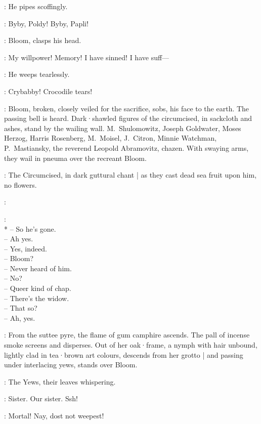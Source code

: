 :
He pipes scoffingly.

\Bello:
Byby,
Poldy!
Byby,
Papli!

:
Bloom,
clasps his head.

\Bloom:
My willpower!
Memory!
I have sinned!
I have suff---

:
He weeps tearlessly.

\Bello:
Crybabby!
Crocodile tears!


:
Bloom,
broken,
closely veiled for the sacrifice,
sobs,
his face to the earth.
%
The passing bell is heard.
Dark·shawled figures of the circumcised,
in sackcloth and ashes,
stand by the wailing wall.
M.~Shulomowitz,
Joseph Goldwater,
Moses Herzog,
Harris Rosenberg,
M.~Moisel,
J.~Citron,
Minnie Watchman,
P.~Mastiansky,
the reverend Leopold Abramovitz,
chazen.
With swaying arms,
they wail in pneuma over the recreant Bloom.

:
The Circumcised,
in dark guttural chant |
as they cast dead sea fruit upon him,
no flowers.

\Circumcised:

\Voices:
\\*
-- So he's gone.\\
-- Ah yes.\\
-- Yes, indeed.\\
-- Bloom?\\
-- Never heard of him.\\
-- No?\\
-- Queer kind of chap.\\
-- There's the widow.\\
-- That so?\\
-- Ah, yes.

:
From the suttee pyre,
the flame of gum camphire ascends.
The pall of incense smoke screens and disperses.
Out of her oak·frame,
a nymph with hair unbound,
lightly clad in tea·brown art colours,
descends from her grotto |
and passing under interlacing yews,
stands over Bloom.

:
The Yews,
their leaves whispering.

\Yews:
Sister.
Our sister.
Ssh!

\Nymph[3b]:
Mortal!
Nay,
dost not weepest!

